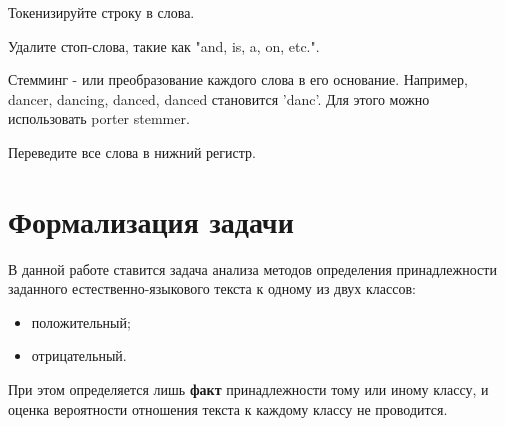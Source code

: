 Токенизируйте строку в слова.

Удалите стоп-слова, такие как "and, is, a, on, etc.".

Стемминг - или преобразование каждого слова в его основание. Например, dancer, dancing, danced, danced становится 'danc'. Для этого можно использовать porter stemmer.

Переведите все слова в нижний регистр.


\section{Формализация задачи}

В данной работе ставится задача анализа методов определения принадлежности
заданного естественно-языкового текста к одному из двух классов:
\begin{itemize}
    \item положительный;
    \item отрицательный.
\end{itemize}

При этом определяется лишь \textbf{факт} принадлежности тому или иному
классу, и оценка вероятности отношения текста к каждому классу не проводится.

